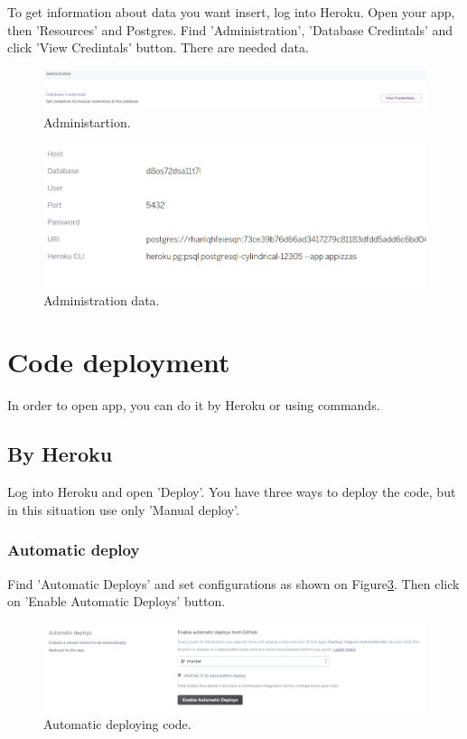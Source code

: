 \documentclass[12pt,a4paper]{article}
\begin{document}
To get information about data you want insert, log into Heroku. Open your app, then 'Resources' and Postgres. Find 'Administration', 'Database Credintals' and click 'View Credintals' button. There are needed data.

\begin{figure}[H]
	\centering
	\includegraphics[width=1\textwidth]{images/admin.PNG}
	\caption{Administartion.}
	\label{fig:ad}
\end{figure}

\begin{figure}[H]
	\centering
	\includegraphics[width=1\textwidth]{images/datas.PNG}
	\caption{Administration data.}
	\label{fig:da}
\end{figure}


\section{Code deployment}
In order to open app, you can do it by Heroku or using commands. \\
\subsection{By Heroku}
Log into Heroku and open 'Deploy'. You have three ways to deploy the code, but in this situation use only 'Manual deploy'.

\subsubsection{Automatic deploy}
 Find 'Automatic Deploys' and set configurations as shown on Figure\ref{fig:dep}. Then click on 'Enable Automatic Deploys' button.

\begin{figure}[H]
	\centering
	\includegraphics[width=1\textwidth]{images/deploy.PNG}
	\caption{Automatic deploying code.}
	\label{fig:dep}
\end{figure}
\end{document}
